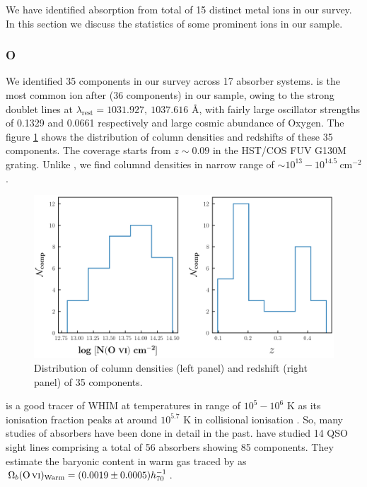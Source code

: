 We have identified absorption from total of 15 distinct metal ions in our survey. In this section we discuss the statistics of some prominent ions in our sample.

\subsubsection*{O \hspace*{-0.5mm}{\footnotesize VI}}

We identified 35  components in our survey across 17 absorber systems.  is the most common ion after  (36 components) in our sample, owing to the strong doublet lines at $\lambda_\text{rest}=1031.927, \ 1037.616$  \AA, with fairly large oscillator strengths of 0.1329 and 0.0661 respectively and large cosmic abundance of Oxygen. The figure \ref{fig:OVI_distribution} shows the distribution of column densities and redshifts of these 35 components. The  coverage starts from $z \sim 0.09$ in the HST/COS FUV G130M grating. Unlike , we find  columnd densities in narrow range of $\sim 10^{13} - 10^{14.5} \ \text{cm}^{-2}$. 

\begin{figure}
    \centering
    \includegraphics[width=\linewidth]{Figures/OVI_distribution_survey.png}
    \caption{Distribution of column densities (left panel) and redshift (right panel) of 35  components.}
    \label{fig:OVI_distribution}
\end{figure}

 is a good tracer of WHIM at temperatures in range of $10^5 - 10^6$ K as its ionisation fraction peaks at around $10^{5.7}$ K in collisional ionisation \citep{Gnat-Sternberg-2007}. So, many studies of  absorbers have been done in detail in the past. \citet{savage-2014} have studied 14 QSO sight lines comprising a total of 56  absorbers showing 85  components. They estimate the baryonic content in warm gas traced by  as $\Omega_b(\ion{O}{vi})_\text{Warm}= (0.0019 \pm 0.0005) h^{-1}_{70}$.


